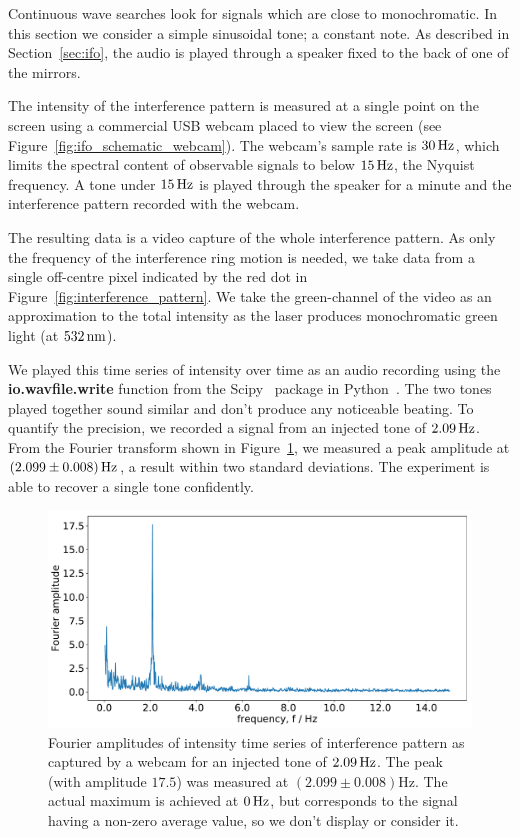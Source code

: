 \documentclass[paper-main.tex]{subfiles}
\begin{document}

Continuous wave searches look for signals which are close to monochromatic. 
In this section we consider a simple sinusoidal tone; a constant note. 
As described in Section~\ref{sec:ifo}, the audio is played through a speaker fixed to the back of one of the mirrors.


The intensity of the interference pattern is measured at a single point on the screen using a commercial USB webcam placed to view the screen (see Figure~\ref{fig:ifo_schematic_webcam}). 
The webcam's sample rate is $30\,{\rm Hz}$, which limits the spectral content of observable signals to below $15\,{\rm Hz}$, the Nyquist frequency.
A tone under $15\,{\rm Hz}$ is played through the speaker for a minute and the interference pattern recorded with the webcam. 


The resulting data is a video capture of the whole interference pattern. 
As only the frequency of the interference ring motion is needed, we take data from a single off-centre pixel indicated by the red dot in Figure~\ref{fig:interference_pattern}. 
We take the green-channel of the video as an approximation to the total intensity as the laser produces monochromatic green light (at $532\,{\rm nm}$).


We played this time series of intensity over time as an audio recording using the \textbf{io.wavfile.write} function from the Scipy~\cite{scipy} package in Python~\cite{python}. 
The two tones played together sound similar and don’t produce any noticeable beating.
To quantify the precision, we recorded a signal from an injected tone of $2.09\,{\rm Hz}$. 
From the Fourier transform shown in Figure~\ref{fig:webcam_spectrum}, we measured a peak amplitude at $(2.099\pm 0.008)\,{\rm Hz}$, a result within two standard deviations. 
The experiment is able to recover a single tone confidently. 

\begin{figure}
	\includegraphics[width=.49\textwidth]{figures/webcam_expt_4_0209-cropped.pdf}
	\caption{Fourier amplitudes of intensity time series of interference pattern as captured by a webcam for an injected tone of $2.09\,{\rm Hz}$. The peak (with amplitude $17.5$) was measured at $(2.099\pm 0.008) \mathrm{Hz}$. The actual maximum is achieved at $0\,{\rm Hz}$, but corresponds to the signal having a non-zero average value, so we don’t display or consider it.}
	\label{fig:webcam_spectrum}
\end{figure}
\end{document}
